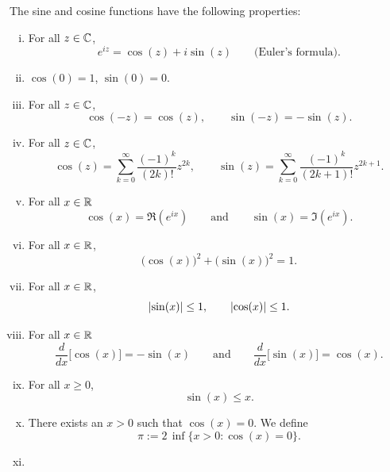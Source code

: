 \pagebreak[2]
\begin{prop}
The sine and cosine functions have the following properties:
\begin{enumerate}[(i)]
\item For all $z \in {\mathbb{C}}$,
\begin{equation*}
e^{iz} = \cos(z) + i\sin(z) \qquad
\text{(Euler's formula)}.
\end{equation*}
\item $\cos(0) = 1$, $\sin(0) = 0$.
\item For all $z \in {\mathbb{C}}$,
\begin{equation*}
\cos(-z) = \cos(z), \qquad
\sin(-z) = -\sin(z).
\end{equation*}
\item For all $z \in {\mathbb{C}}$,
\begin{equation*}
\cos(z) = \sum_{k=0}^\infty \frac{{(-1)}^k}{(2k)!} z^{2k} ,
\qquad
\sin(z) = \sum_{k=0}^\infty \frac{{(-1)}^k}{(2k+1)!} z^{2k+1} .
\end{equation*}
\item For all $x \in {\mathbb{R}}$
\begin{equation*}
\cos(x) = \Re (e^{ix})
\qquad\text{and}\qquad
\sin(x) = \Im (e^{ix}) .
\end{equation*}
\item For all $x \in {\mathbb{R}}$,
\begin{equation*}
{\bigl( \cos(x) \bigr)}^2 + {\bigl( \sin(x) \bigr)}^2 = 1 .
\end{equation*}
\item For all $x \in {\mathbb{R}}$,
\begin{equation*}
\lvert {\sin(x)} \rvert \leq 1, \qquad \lvert {\cos(x)} \rvert \leq 1 .
\end{equation*}
\item For all $x \in {\mathbb{R}}$
\begin{equation*}
\frac{d}{dx} \bigl[ \cos(x) \bigr] = -\sin(x)
\qquad \text{and} \qquad
\frac{d}{dx} \bigl[ \sin(x) \bigr] = \cos(x) .
\end{equation*}
\item For all $x \geq 0$,
\begin{equation*}
\sin(x) \leq x .
\end{equation*}
\item
There exists an $x > 0$ such that $\cos(x) = 0$.  We define
\begin{equation*}
\pi := 2 \, \inf \{ x > 0 : \cos(x) = 0 \} .
\end{equation*}
\item

\end{enumerate}
\end{prop}
